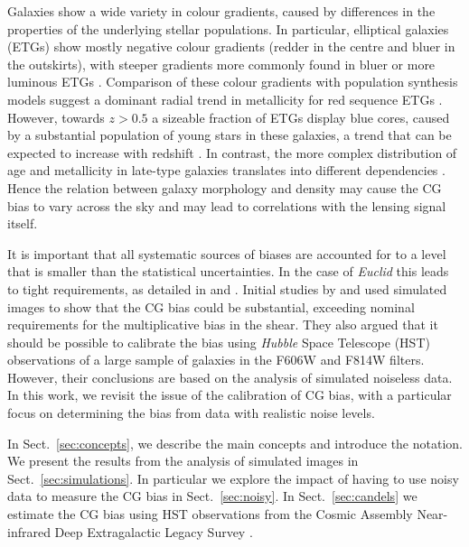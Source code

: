 \documentclass[useAMS,usenatbib]{mnras}
\begin{document}
Galaxies show a wide variety in colour gradients,  caused by differences in the properties
of the underlying stellar populations. In particular, elliptical galaxies (ETGs) show mostly
negative colour gradients (redder in the centre and bluer in the outskirts), with steeper gradients more commonly found in bluer or more luminous ETGs \citep[e.g.][]{2005ApJ...635..243F, 2011MNRAS.414.3052D, 2011MNRAS.411.1151G}. Comparison of these colour gradients with population
synthesis models suggest a dominant radial trend in metallicity for red sequence ETGs
\citep[e.g.][]{2011ApJ...740L..41L,2016A&A...593A..84K}. However, towards $z>0.5$ a sizeable
fraction of ETGs display blue cores, caused by a substantial population of young stars in these
galaxies, a trend that can be expected to increase with redshift \citep{2009MNRAS.395..554F, 2010ApJS..187..374S}. In contrast, the more complex distribution of age and metallicity in
late-type galaxies translates into different dependencies \citep{2005ApJ...630..784T}. Hence the relation between galaxy morphology and density may cause the CG bias to vary across the sky and may lead to correlations with the lensing signal itself.

It is important that all systematic sources of biases are accounted for to a level that is smaller than the
statistical uncertainties. In the case of {\it Euclid} this leads to tight requirements, as detailed in
\cite{Massey13} and \cite{Cropper13}. Initial studies by \cite{Voigt12} and  used simulated images to show that the CG bias could be substantial,
exceeding nominal requirements for the multiplicative bias in the shear. They also argued
that it should be possible to calibrate the bias using {\it Hubble} Space Telescope (HST) observations
of a large sample of galaxies in the F606W and F814W filters. However, their conclusions are based on the analysis of simulated noiseless data. In this work, we revisit the issue of the calibration of CG bias,
with a particular focus on determining the bias from data with realistic noise levels.

In Sect.~\ref{sec:concepts}, we describe the main concepts and introduce the notation. We present the results from the analysis of simulated images in Sect.~\ref{sec:simulations}. In particular we explore the  impact of having to use noisy data to measure the CG bias in Sect.~\ref{sec:noisy}.
In Sect.~\ref{sec:candels} we estimate the CG bias using HST observations from the Cosmic Assembly Near-infrared Deep Extragalactic Legacy Survey \citep[CANDELS;][]{Koekemoer11}.
\end{document}
